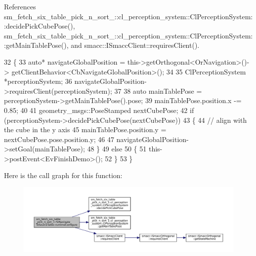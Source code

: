 References sm\+\_\+fetch\+\_\+six\+\_\+table\+\_\+pick\+\_\+n\+\_\+sort\+\_\+::cl\+\_\+perception\+\_\+system\+::\+Cl\+Perception\+System\+::decide\+Pick\+Cube\+Pose(), sm\+\_\+fetch\+\_\+six\+\_\+table\+\_\+pick\+\_\+n\+\_\+sort\+\_\+::cl\+\_\+perception\+\_\+system\+::\+Cl\+Perception\+System\+::get\+Main\+Table\+Pose(), and smacc\+::\+I\+Smacc\+Client\+::requires\+Client().


\begin{DoxyCode}
32         \{
33             \textcolor{keyword}{auto}* navigateGlobalPosition = this->getOrthogonal<OrNavigation>()->
      getClientBehavior<CbNavigateGlobalPosition>();
34             
35             ClPerceptionSystem *perceptionSystem;
36             navigateGlobalPosition->requiresClient(perceptionSystem);
37 
38             \textcolor{keyword}{auto} mainTablePose = perceptionSystem->getMainTablePose().pose;
39             mainTablePose.position.x -= 0.85;
40 
41             geometry\_msgs::PoseStamped nextCubePose;
42             \textcolor{keywordflow}{if} (perceptionSystem->decidePickCubePose(nextCubePose))
43             \{
44                 \textcolor{comment}{// align with the cube in the y axis}
45                 mainTablePose.position.y = nextCubePose.pose.position.y;
46 
47                 navigateGlobalPosition->setGoal(mainTablePose);
48             \}
49             \textcolor{keywordflow}{else}
50             \{
51                 this->postEvent<EvFinishDemo>();
52             \}
53         \}
\end{DoxyCode}
Here is the call graph for this function\+:
\nopagebreak
\begin{figure}[H]
\begin{center}
\leavevmode
\includegraphics[width=350pt]{structsm__fetch__six__table__pick__n__sort__1_1_1StNavigateToSourceTable_a1e4b8cd70fbb88d5c42ebfdc48a9122f_cgraph}
\end{center}
\end{figure}
\mbox{\label{structsm__fetch__six__table__pick__n__sort__1_1_1StNavigateToSourceTable_a836a8ec737b708629633afb0655b3920}} 
